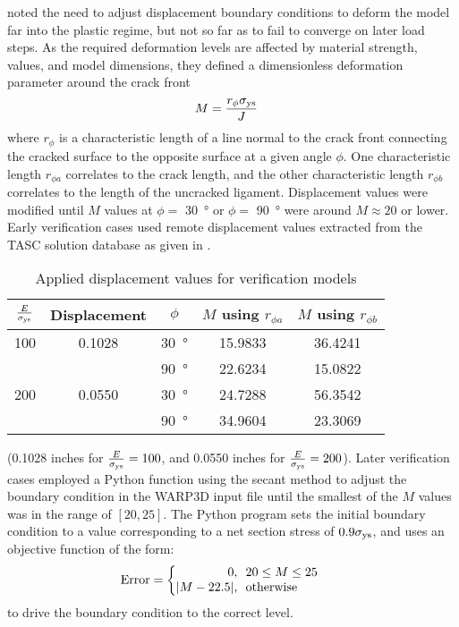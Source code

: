 \citeauthor[p.~178]{allenwells2014} noted the need to adjust displacement boundary conditions to deform the model far into the plastic regime, but not so far as to fail to converge on later load steps.
As the required deformation levels are affected by material strength, \J values, and model dimensions, they defined a dimensionless deformation parameter around the crack front
\begin{align*}
M &= \frac{r_\phi \sigma_{\textnormal{ys}}}{J}
\end{align*}
where \(r_\phi\) is a characteristic length of a line normal to the crack front connecting the cracked surface to the opposite surface at a given angle \(\phi\).
One characteristic length \(r_{\phi a}\) correlates to the crack length, and the other characteristic length \(r_{\phi b}\) correlates to the length of the uncracked ligament.
Displacement values were modified until \(M\) values at \(\phi = \) \SI{30}{\degree} or \(\phi = \) \SI{90}{\degree} were around \(M \approx 20 \) or lower.
Early verification cases used remote displacement values extracted from the TASC solution database as given in .
\begin{table}[pb]
\caption{\label{tab:displacement_values} Applied displacement values for verification models}
\centering
\begin{tabular}{S[table-format=3.0] S[table-format=1.4] S *2{S[table-format=1.4]}} \toprule
{\(\frac{E}{\sigma_{\textnormal{ys}}}\)} & {Displacement} & {\(\phi\)} & {\(M\) using \(r_{\phi a}\)} & {\(M\) using \(r_{\phi b}\)} \\  & 0.1028 & \SI{30}{\degree} & 15.9833 & 36.4241 \\
    &        & \SI{90}{\degree} & 22.6234 & 15.0822 \\
200 & 0.0550 & \SI{30}{\degree} & 24.7288 & 56.3542 \\
    &        & \SI{90}{\degree} & 34.9604 & 23.3069 \\
\bottomrule
\end{tabular}
\end{table}
(0.1028 inches for \(\frac{E}{\sigma_{\textnormal{ys}}} = 100\), and 0.0550 inches for \(\frac{E}{\sigma_{\textnormal{ys}}} = 200\)).
Later verification cases employed a Python function using the secant method to adjust the boundary condition in the WARP3D input file until the smallest of the \(M\) values was in the range of \([20, 25]\).
The Python program sets the initial boundary condition to a value corresponding to a net section stress of \(0.9\sigma_{\textnormal{ys}}\), and uses an objective function of the form:
\begin{align*}
\text{Error} &= 
\begin{cases}
\begin{aligned} %
0 &,\enskip 20 \leq M \leq 25 \\
|M-22.5| &,\enskip \text{otherwise}
\end{aligned}
\end{cases}
\end{align*}
to drive the boundary condition to the correct level.


